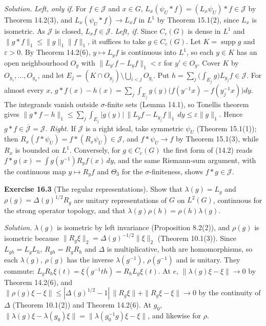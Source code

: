 \documentclass[
  english,
  11pt,
  a4paper,
]{article}
\begin{document}
\emph{Solution.} \emph{Left, only if.} For \(f\in\mathcal J\) and
\(x\in G\), \(L_x(\psi_U*f)=(L_x\psi_U)*f\in\mathcal J\) by Theorem
14.2(3), and \(L_x(\psi_U*f)\to L_xf\) in \(L^1\) by Theorem 15.1(2),
since \(L_x\) is isometric. As \(\mathcal J\) is closed,
\(L_xf\in\mathcal J\). \emph{Left, if.} Since \(C_c(G)\) is dense in
\(L^1\) and \(\|g*f\|_1\leq\|g\|_1\|f\|_1\), it suffices to take
\(g\in C_c(G)\). Let \(K=\operatorname{supp}g\) and \(\varepsilon>0\).
By Theorem 14.2(6), \(y\mapsto L_yf\) is continuous into \(L^1\), so
each \(y\in K\) has an open neighbourhood \(O_y\) with
\(\|L_{y'}f-L_yf\|_1<\varepsilon\) for \(y'\in O_y\). Cover \(K\) by
\(O_{y_1},\dots,O_{y_n}\), and let
\(E_j=(K\cap O_{y_j})\setminus\bigcup_{i<j}O_{y_i}\). Put
\(h=\sum_j\big(\int_{E_j}g\big)L_{y_j}f\in\mathcal J\). For almost every
\(x\),
\(g*f(x)-h(x)=\sum_j\int_{E_j}g(y)\big(f(y^{-1}x)-f(y_j^{-1}x)\big)dy\).
The integrands vanish outside \(\sigma\)-finite sets (Lemma 14.1), so
Tonelli\textquotesingle s theorem gives
\(\|g*f-h\|_1\leq\sum_j\int_{E_j}|g(y)|\,\|L_yf-L_{y_j}f\|_1\,dy\leq\varepsilon\|g\|_1\).
Hence \(g*f\in\overline{\mathcal J}=\mathcal J\). \emph{Right.} If
\(\mathcal J\) is a right ideal, take symmetric \(\psi_U\) (Theorem
15.1(1)); then \(R_x(f*\psi_U)=f*(R_x\psi_U)\in\mathcal J\), and
\(f*\psi_U\to f\) by Theorem 15.1(3), while \(R_x\) is bounded on
\(L^1\). Conversely, for \(g\in C_c(G)\) the first form of (14.2) reads
\(f*g(x)=\int g(y^{-1})R_yf(x)\,dy\), and the same Riemann-sum argument,
with the continuous map \(y\mapsto R_yf\) and \(\Theta_3\) for the
\(\sigma\)-finiteness, shows \(f*g\in\mathcal J\).

\textbf{Exercise 16.3} (The regular representations). Show that
\(\lambda(g)=L_g\) and \(\rho(g)=\Delta(g)^{1/2}R_g\) are unitary
representations of \(G\) on \(L^2(G)\), continuous for the strong
operator topology, and that \(\lambda(g)\rho(h)=\rho(h)\lambda(g)\).

\emph{Solution.} \(\lambda(g)\) is isometric by left invariance
(Proposition 8.2(2)), and \(\rho(g)\) is isometric because
\(\|R_g\xi\|_2=\Delta(g)^{-1/2}\|\xi\|_2\) (Theorem 10.1(3)). Since
\(L_{gh}=L_gL_h\), \(R_{gh}=R_gR_h\) and \(\Delta\) is multiplicative,
both are homomorphisms, so each \(\lambda(g)\), \(\rho(g)\) has the
inverse \(\lambda(g^{-1})\), \(\rho(g^{-1})\) and is unitary. They
commute: \(L_gR_h\xi(t)=\xi(g^{-1}th)=R_hL_g\xi(t)\). At \(e\),
\(\|\lambda(g)\xi-\xi\|\to0\) by Theorem 14.2(6), and
\(\|\rho(g)\xi-\xi\|\leq|\Delta(g)^{1/2}-1|\,\|R_g\xi\|+\|R_g\xi-\xi\|\to0\)
by the continuity of \(\Delta\) (Theorem 10.1(2)) and Theorem 14.2(6).
At \(g_0\),
\(\|\lambda(g)\xi-\lambda(g_0)\xi\|=\|\lambda(g_0^{-1}g)\xi-\xi\|\), and
likewise for \(\rho\).
\end{document}
